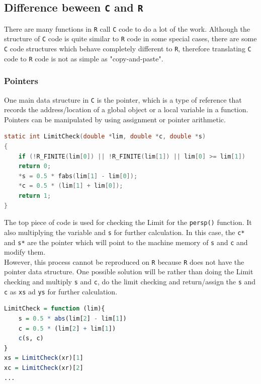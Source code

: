 \documentclass[paper=a4, fontsize=11pt]{report}
\begin{document}
\newpage
\subsection{Difference beween \texttt{C} and \texttt{R}}
There are many functions in \texttt{R} call \texttt{C} code to do a lot of the work. Although the structure of \texttt{C} code is quite similar to \texttt{R} code in some special cases, there are some \texttt{C} code structures which behave completely different to \texttt{R}, therefore translating \texttt{C} code to \texttt{R} code is not as simple as "copy-and-paste".\\

\subsubsection{Pointers}
One main data structure in \texttt{C} is the pointer, which is a type of reference that records the address/location of a global object or a local variable in a function. Pointers can be manipulated by using assignment or pointer arithmetic.
\begin{lstlisting}[language = C]
static int LimitCheck(double *lim, double *c, double *s)
{
    if (!R_FINITE(lim[0]) || !R_FINITE(lim[1]) || lim[0] >= lim[1])
    return 0;
    *s = 0.5 * fabs(lim[1] - lim[0]);
    *c = 0.5 * (lim[1] + lim[0]);
    return 1;
}
\end{lstlisting}

The top piece of code is used for checking the Limit for the \texttt{persp()} function. It also multiplying the variable  and \texttt{s} for further calculation. In this case, the \texttt{c*} and \texttt{s*} are the pointer which will point to the machine memory of \texttt{s} and \texttt{c} and modify them.\\

However, this process cannot be reproduced on \texttt{R} because \texttt{R} does not have the pointer data structure. One possible solution will be rather than doing the Limit checking and multiply \texttt{s} and \texttt{c}, do the limit checking and return/assign the \texttt{s} and \texttt{c} as \texttt{xs} ad \texttt{ys} for further calculation.
\begin{lstlisting}[language = R]
LimitCheck = function (lim){
    s = 0.5 * abs(lim[2] - lim[1])
    c = 0.5 * (lim[2] + lim[1])
    c(s, c)
}
xs = LimitCheck(xr)[1]
xc = LimitCheck(xr)[2]
...
\end{lstlisting}

\newpage
\end{document}
